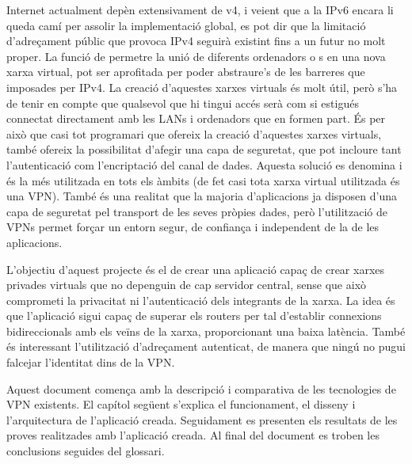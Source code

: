 Internet actualment depèn extensivament de v4, i veient que a la IPv6 encara li queda camí per assolir la implementació global, es pot dir que la limitació d'adreçament públic que provoca IPv4 seguirà existint fins a un futur no molt proper. La funció de permetre la unió de diferents ordenadors o s en una nova xarxa virtual, pot ser aprofitada per poder abstraure's de les barreres que imposades per IPv4. La creació d'aquestes xarxes virtuals és molt útil, però s'ha de tenir en compte que qualsevol que hi tingui accés serà com si estigués connectat directament amb les LANs i ordenadors que en formen part. És per això que casi tot programari que ofereix la creació d'aquestes xarxes virtuals, també ofereix la possibilitat d'afegir una capa de seguretat, que pot incloure tant l'autenticació com l'encriptació del canal de dades. Aquesta solució es denomina  i és la més utilitzada en tots els àmbits (de fet casi tota xarxa virtual utilitzada és una VPN).
També és una realitat que la majoria d'aplicacions ja disposen d'una capa de seguretat pel transport de les seves pròpies dades, però l'utilització de VPNs permet forçar un entorn segur, de confiança i independent de la de les aplicacions. 

L'objectiu d'aquest projecte és el de crear una aplicació capaç de crear xarxes privades virtuals que no depenguin de cap servidor central, sense que això comprometi la privacitat ni l'autenticació dels integrants de la xarxa. La idea és que l'aplicació sigui capaç de superar els routers  per tal d'establir connexions bidireccionals amb els veïns de la xarxa, proporcionant una baixa latència. També és interessant l'utilització d'adreçament autenticat, de manera que ningú no pugui falcejar l'identitat dins de la VPN.

Aquest document comença amb la descripció i comparativa de les tecnologies de VPN existents.
El capítol següent s'explica el funcionament, el disseny i l'arquitectura de l'aplicació creada.
Seguidament es presenten els resultats de les proves realitzades amb l'aplicació creada. 
Al final del document es troben les conclusions seguides del glossari. 
